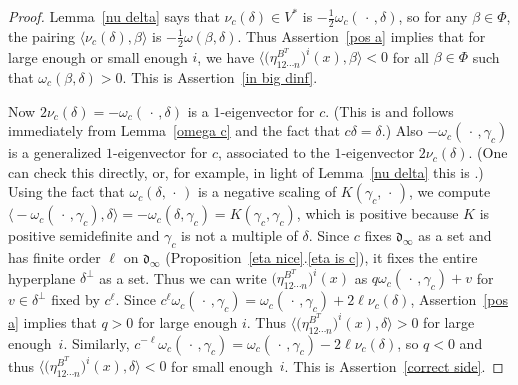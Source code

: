 \documentclass[10pt]{article}
\theoremstyle{definition}
\theoremstyle{remark}
\numberwithin{equation}{section}
\newcommand{\br}[1]{{\langle #1 \rangle}}
\newcommand{\brr}[1]{{\bigl\langle #1 \bigr\rangle}}
\newcommand{\0}{{\mathbf{0}}}
\renewcommand{\d}{{\mathfrak d}}
\newcommand{\RSChar}{\Phi}
\newcommand{\RS}{\RSChar}
\begin{document}
\begin{proof}
Lemma~\ref{nu delta} says that $\nu_c(\delta)\in V^*$ is $-\frac12\omega_c(\,\cdot\,,\delta)$, so for any $\beta\in\RS$, the pairing $\br{\nu_c(\delta),\beta}$ is $-\frac12\omega(\beta,\delta)$.
Thus Assertion~\ref{pos a} implies that for large enough or small enough $i$, we have $\brr{\bigl(\eta_{12\cdots n}^{B^T}\bigr)^i(x),\beta}<0$ for all $\beta\in\RS$ such that $\omega_c(\beta,\delta)>0$.
This is Assertion~\ref{in big dinf}.  

Now $2\nu_c(\delta)=-\omega_c(\,\cdot\,,\delta)$ is a $1$-eigenvector for $c$.
(This is \cite[Lemma~3.5]{afforb} and follows immediately from Lemma~\ref{omega c} and the fact that $c\delta=\delta$.)
Also $-\omega_c(\,\cdot\,,\gamma_c)$ is a generalized $1$-eigenvector for $c$, associated to the $1$-eigenvector $2\nu_c(\delta)$.
(One can check this directly, or, for example, in light of Lemma~\ref{nu delta} this is \cite[Lemma~2.8]{affncA}.)
Using the fact \cite[Lemma~3.5]{afforb} that $\omega_c(\delta,\,\cdot\,)$ is a negative scaling of $K(\gamma_c,\,\cdot\,)$, we compute $\brr{-\omega_c(\,\cdot\,,\gamma_c),\delta}=-\omega_c(\delta,\gamma_c)=K(\gamma_c,\gamma_c)$, which is positive because $K$ is positive semidefinite and $\gamma_c$ is not a multiple of $\delta$.
Since $c$ fixes $\d_\infty$ as a set and has finite order $\ell$ on $\d_\infty$ (Proposition~\ref{eta nice}.\ref{eta is c}), it fixes the entire hyperplane $\delta^\perp$ as a set.
Thus we can write $\bigl(\eta_{12\cdots n}^{B^T}\bigr)^i(x)$ as $q\omega_c(\,\cdot\,,\gamma_c)+v$ for $v\in\delta^\perp$ fixed by $c^\ell$.
Since $c^\ell\omega_c(\,\cdot\,,\gamma_c)=\omega_c(\,\cdot\,,\gamma_c)+2\ell\nu_c(\delta)$, Assertion~\ref{pos a} implies that $q>0$ for large enough $i$.
Thus $\brr{\bigl(\eta_{12\cdots n}^{B^T}\bigr)^i(x),\delta}>0$ for large enough~$i$.
  Similarly, $c^{-\ell}\omega_c(\,\cdot\,,\gamma_c)=\omega_c(\,\cdot\,,\gamma_c)-2\ell\nu_c(\delta)$, so $q<0$ and thus $\brr{\bigl(\eta_{12\cdots n}^{B^T}\bigr)^i(x),\delta}<0$ for small enough~$i$.
This is Assertion~\ref{correct side}.
\end{proof}
\end{document}
